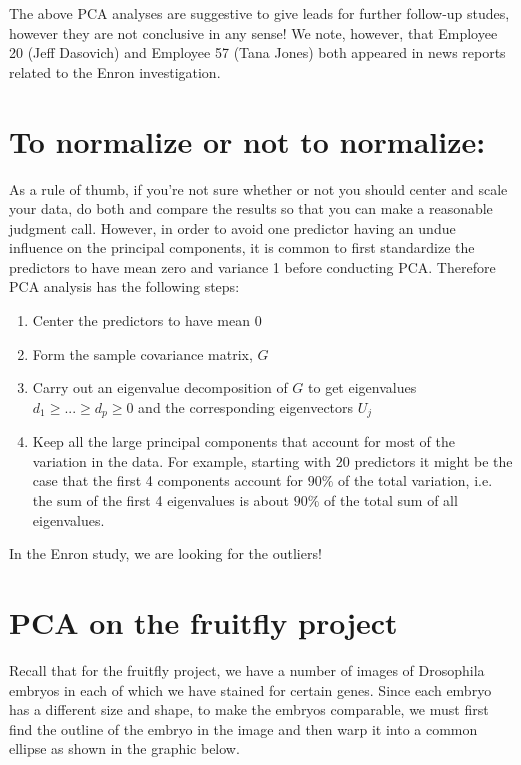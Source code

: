 The above PCA analyses are suggestive to give leads for further follow-up studes, however they are not conclusive in any sense! We note, however, that Employee 20 (Jeff Dasovich) and Employee 57 (Tana Jones) both appeared in news reports related to the Enron investigation.




\section{To normalize or not to normalize:}

As a rule of thumb, if you're not sure whether or not you should center and scale your data, do both and compare the results so that you can make a reasonable judgment call. However, in order to avoid one predictor having an undue influence on the principal components, it is common to first standardize the predictors to have mean zero and variance 1 before conducting PCA. Therefore PCA analysis has the following steps:

\begin{enumerate}
\item Center the predictors to have mean 0
\item Form the sample covariance matrix, $G$
\item Carry out an eigenvalue decomposition of $G$ to get eigenvalues $d_1 \geq ... \geq d_p \geq 0$ and the corresponding eigenvectors $U_j$
\item Keep all the large principal components that account for most of the variation in the data. For example, starting with 20 predictors it might be the case that the first 4 components account for $90\%$ of the total variation, i.e. the sum of the first 4 eigenvalues is about $90\%$ of the total sum of all eigenvalues.

\end{enumerate}

In the Enron study, we are looking for the outliers!


\section{PCA on the fruitfly project}

Recall that for the fruitfly project, we have a number of images of Drosophila embryos in each of which we have stained for certain genes. Since each embryo has a different size and shape, to make the embryos comparable, we must first find the outline of the embryo in the image and then warp it into a common ellipse as shown in the graphic below.

